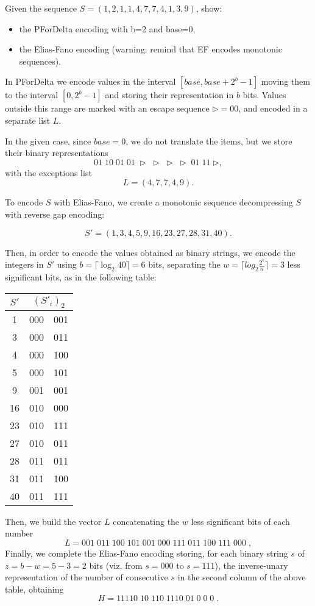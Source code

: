 \exercise

Given the sequence $S = (1, 2, 1, 1, 4, 7, 7, 4, 1, 3, 9)$, show:
%
\begin{itemize}
  \item the PForDelta encoding with b=2 and base=0,
  \item the Elias-Fano encoding (warning: remind that EF encodes monotonic
    sequences).
\end{itemize}

\solution

In PForDelta we encode values in the interval $[base,base+2^b-1]$ moving
them to the interval $[0, 2^b-1]$ and storing their representation in $b$ bits.
Values outside this range are marked with an escape sequence
$\triangleright=00$, and encoded in a separate list $L$.

In the given case, since $base=0$, we do not translate the items, but we store
their binary representations
%
$$01\;10\;01\;01\;\triangleright\;\triangleright\;\triangleright\;\triangleright\;01\;11\;\triangleright,$$
%
with the exceptions list
$$L=(4,7,7,4,9).$$

To encode $S$ with Elias-Fano, we create a monotonic sequence decompressing $S$
with reverse gap encoding:

$$S'=(1,3,4,5,9,16,23,27,28,31,40).$$

Then, in order to encode the values obtained as binary strings, we encode the
integers in $S'$ using $b = \lceil \log_2{40}\rceil = 6$ bits, separating the
$w = \lceil log_2{\frac{2^b}{n}}\rceil = 3$ less significant bits, as in the
following table:
%
\begin{center}
  \begin{tabular}{ c | c | c }
    $S'$ & \multicolumn{2}{c}{$(S'_i)_2$} \\ \hline
     1 & 000 & 001 \\
     3 & 000 & 011 \\
     4 & 000 & 100 \\
     5 & 000 & 101 \\
     9 & 001 & 001 \\
     16 & 010 & 000 \\
     23 & 010 & 111 \\
     27 & 010 & 011 \\
     28 & 011 & 011 \\
     31 & 011 & 100 \\
     40 & 011 & 111
  \end{tabular}
\end{center}
%
Then, we build the vector $L$ concatenating the $w$ less significant bits of
each number
%
$$L = 001\;011\;100\;101\;001\;000\;111\;011\;100\;111\;000\;,$$
%
Finally, we complete the Elias-Fano encoding storing, for each binary string $s$
of $z = b - w = 5 - 3 = 2$ bits (viz. from $s=000$ to $s=111$), the
inverse-unary representation of the number of consecutive $s$ in the second
column of the above table, obtaining
%
$$H = 11110\;10\;110\;1110\;01\;0\;0\;0\;.$$
